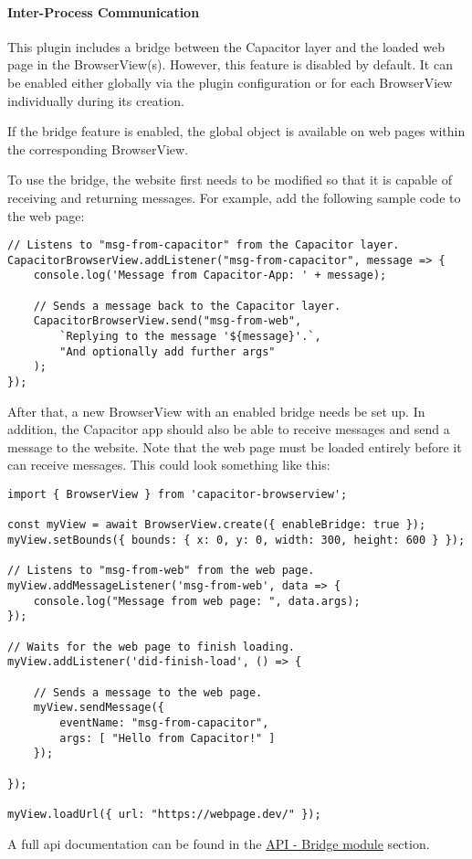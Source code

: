 \newpage

\paragraph{Inter-Process Communication}
\label{sec:Capacitor-BrowserView:InterprocessCommunication}

This plugin includes a bridge between the Capacitor layer and the loaded web page in the BrowserView(s).
However, this feature is disabled by default. It can be enabled either globally via the plugin configuration or for each BrowserView individually during its creation.

If the bridge feature is enabled, the global object  is available on web pages within the corresponding BrowserView.

To use the bridge, the website first needs to be modified so that it is capable of receiving and returning messages.
For example, add the following sample code to the web page:

\begin{verbatim}
// Listens to "msg-from-capacitor" from the Capacitor layer.
CapacitorBrowserView.addListener("msg-from-capacitor", message => {
    console.log('Message from Capacitor-App: ' + message);

    // Sends a message back to the Capacitor layer.
    CapacitorBrowserView.send("msg-from-web",
        `Replying to the message '${message}'.`,
        "And optionally add further args"
    );
});
\end{verbatim}

After that, a new BrowserView with an enabled bridge needs be set up.
In addition, the Capacitor app should also be able to receive messages and send a message to the website.
Note that the web page must be loaded entirely before it can receive messages.
This could look something like this:

\begin{verbatim}
import { BrowserView } from 'capacitor-browserview';

const myView = await BrowserView.create({ enableBridge: true });
myView.setBounds({ bounds: { x: 0, y: 0, width: 300, height: 600 } });

// Listens to "msg-from-web" from the web page.
myView.addMessageListener('msg-from-web', data => {
    console.log("Message from web page: ", data.args);
});

// Waits for the web page to finish loading.
myView.addListener('did-finish-load', () => {

    // Sends a message to the web page.
    myView.sendMessage({
        eventName: "msg-from-capacitor",
        args: [ "Hello from Capacitor!" ]
    });

});

myView.loadUrl({ url: "https://webpage.dev/" });
\end{verbatim}

A full \ac{api} documentation can be found in the \hyperref[sec:Capacitor-BrowserView:API_BridgeModule]{API - Bridge module} section.
